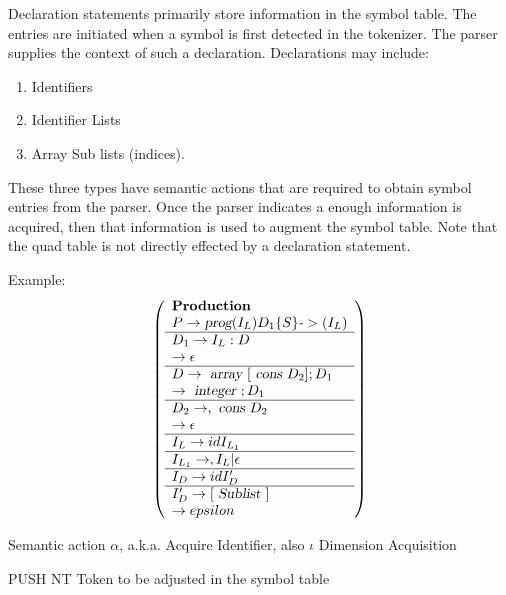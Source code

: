 \documentclass[11pt]{article}
\begin{document}
Declaration statements primarily store information in the symbol table.  The entries are initiated when a symbol is first detected in the tokenizer.  The parser supplies the context of such a declaration.  Declarations may include: 
\begin{enumerate}
\item Identifiers 
\item Identifier Lists
\item Array Sub lists (indices).  
\end{enumerate}
These three types have semantic actions that are required to obtain symbol entries from the parser.  Once the parser indicates a enough information is acquired,  then that information is used to augment the symbol table.  Note that the quad table is not directly effected by a declaration statement.  

Example:
\[
\left(
\begin{array}{l}
\textbf{Production} \\
P \to \textsl{prog} (I_L ) D_1  \{ S \} \textsl{-}> (I_L) \\
\hline
D_1 \to I_L : D  \\
\to \epsilon   \\
\hline 
D \to \textsl{ array } [ \textsl{ cons }  D_2 ]; D_1   \\
\to \textsl{ integer }; D_1    \\
\hline
D_2 \to , \textsl{ cons } D_2   \\
\to \epsilon   \\
\hline
I_L \to id I_{L_1}     \\
\hline
I_{L_1} \to , I_L | \epsilon   \\
\hline
I_D \to id  I'_D   \\
\hline
I'_D \to [\textsl{ Sublist }  ]   \\
\to epsilon   \\
\end{array}
\right)
\]


\begin {algorithm}
\caption{ Semantic action $\alpha$, a.k.a. Acquire Identifier, also $\iota$ Dimension Acquisition  }
\label{alg:A0}
\begin{algorithmic}
\STATE \textrm { PUSH NT }  Token to be adjusted in the symbol table
\end{algorithmic}
\end{algorithm}
\end{document}
